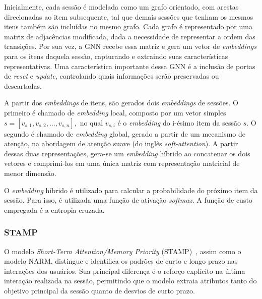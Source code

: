 Inicialmente, cada sessão é modelada como um grafo orientado, com arestas
direcionadas ao item subsequente, tal que demais sessões que tenham os mesmos
itens também são incluídas no mesmo grafo. Cada grafo é representado por uma
matriz de adjacências modificada, dada a necessidade de representar a ordem das
transições. Por sua vez, a GNN recebe essa matriz e gera um vetor de
\textit{embeddings} para os itens daquela sessão, capturando e extraindo suas
características representativas. Uma característica importante dessa GNN é a inclusão
de portas de \textit{reset} e \textit{update}, controlando quais informações
serão preservadas ou descartadas.

A partir dos \textit{embeddings} de itens, são gerados dois \textit{embeddings}
de sessões. O primeiro é chamado de \textit{embedding} local, composto por um
vetor simples $s = [v_{s,1}, v_{s,2}, \ldots, v_{s,n}],$ no qual $v_{s,i}$ é o
\textit{embedding} do i-ésimo item da sessão $s$. O segundo é chamado de
\textit{embedding} global, gerado a partir de um mecanismo de atenção, na
abordagem de atenção suave (do inglês \textit{soft-attention}). A partir dessas
duas representações, gera-se um \textit{embedding} híbrido ao concatenar os dois
vetores e comprimi-los em uma única matriz com representação matricial de menor
dimensão.

O \textit{embedding} híbrido é utilizado para calcular a probabilidade do próximo item
da sessão. Para isso, é utilizada uma função de ativação \textit{softmax}. A função de custo
empregada é a entropia cruzada.

\subsubsection{STAMP}
 O modelo
\textit{Short-Term Attention/Memory Priority} (STAMP)~\cite{stamp}, assim como o
modelo NARM, distingue e identifica os padrões de curto e longo prazo nas
interações dos usuários. Sua principal diferença é o reforço explícito na última
interação realizada na sessão, permitindo que o modelo extraia atributos tanto
do objetivo principal da sessão quanto de desvios de curto prazo.

